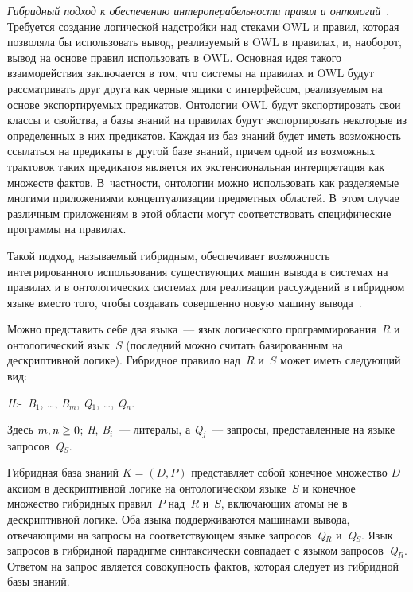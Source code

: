 \begin{multicols}{2}
\textit{Гибридный подход к обеспечению интероперабельности правил и 
онтологий}~\cite{25kal}. Требуется создание логической надстройки над стеками OWL и 
правил, которая позволяла бы использовать вывод, реализуемый в OWL в правилах, и, 
наоборот, вывод на основе правил использовать в OWL. Основная идея такого 
взаимодействия заключается в том, что системы на правилах и OWL будут рассматривать 
друг друга как черные ящики с интерфейсом, реализуемым на основе экспортируемых 
предикатов. Онтологии OWL будут экспортировать свои классы и свойства, а базы знаний на 
правилах будут экспортировать некоторые из определенных в них предикатов. Каждая из 
баз знаний будет иметь возможность ссылаться на предикаты в другой базе знаний, причем 
одной из возможных трактовок таких предикатов является их экстенсиональная 
интерпретация как множеств фактов. В~част\-ности, онтологии можно использовать как 
разделяемые многими приложениями концептуализации предметных областей. В~этом 
случае различным приложениям в этой области могут соответствовать специфические 
программы на правилах.

Такой подход, называемый гибридным, обеспечивает возможность интегрированного 
использования существующих машин вывода в системах на правилах и в онтологических 
системах для реализации рассуждений в гибридном языке вместо того, чтобы создавать 
совершенно новую машину вывода~\cite{43kal}.

Можно представить себе два языка~--- язык логического программирования~$R$ и 
онтологический язык~$S$ (последний можно считать базированным на дескриптивной 
логике). Гибридное правило над~$R$ и~$S$ может иметь следующий вид:

\begin{center}
\textit{H}:\;-\ \textit{B}$_1$, \ldots , \textit{B}$_m$, \textit{Q}$_1$, \ldots , \textit{Q}$_n$.
\end{center}

\noindent
Здесь $m, n \hm\geq 0$; \textit{H}, \textit{B}$_i$~--- литералы, а 
\textit{Q}$_j$~--- запросы, представленные на языке 
запросов~\textit{Q}$_S$.

Гибридная база знаний $K = (D, P)$ представляет собой конечное множество $D$ аксиом в 
дескриптивной логике на онтологическом языке~$S$ и конечное множество гибридных 
правил~$P$ над~$R$ и~$S$, включающих атомы не в дескриптивной логике. Оба языка 
поддерживаются машинами вывода, отвечающими на запросы на соответствующем языке 
запросов~\textit{Q}$_R$ и~\textit{Q}$_S$. Язык запросов в гибридной парадигме 
синтаксически совпадает с 
языком запросов~\textit{Q}$_R$. Ответом на запрос является совокупность фактов, которая следует 
из гибридной базы знаний.


\end{multicols}
